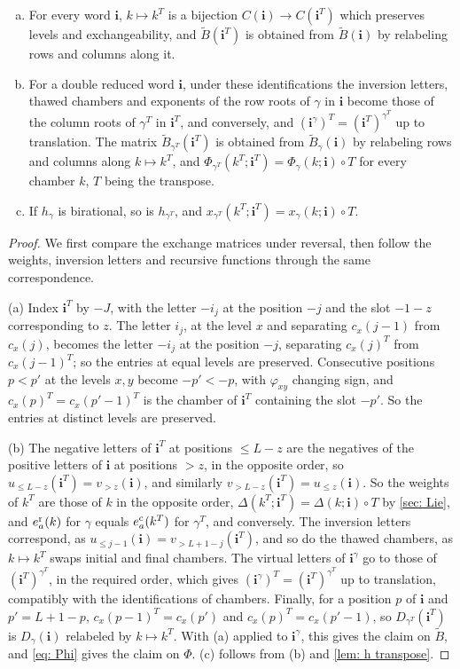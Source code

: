 \documentclass[a4paper]{amsart}
\numberwithin{equation}{section}
\theoremstyle{definition}
\theoremstyle{remark}
\newcommand{\bfi}{\mathbf{i}}
\newcommand{\tB}{\widetilde{B}}
\newcommand{\rr}{{\rm r}}
\newcommand{\cc}{{\rm c}}
\begin{document}
\begin{lemma}
  \label{lem: mirror}
  \begin{enumerate}[(a)]
    \item For every word $\bfi$, $k\mapsto k^T$ is a bijection $C(\bfi)\to C(\bfi^T)$ which preserves levels and exchangeability, and $\tB(\bfi^T)$ is obtained from $\tB(\bfi)$ by relabeling rows and columns along it.
    \item For a double reduced word $\bfi$, under these identifications the inversion letters, thawed chambers and exponents of the row roots of $\gamma$ in $\bfi$ become those of the column roots of $\gamma^T$ in $\bfi^T$, and conversely, and $(\bfi^\gamma)^T=(\bfi^T)^{\gamma^T}$ up to translation.
    The matrix $\tB_{\gamma^T}(\bfi^T)$ is obtained from $\tB_\gamma(\bfi)$ by relabeling rows and columns along $k\mapsto k^T$, and $\Phi_{\gamma^T}(k^T;\bfi^T)=\Phi_\gamma(k;\bfi)\circ T$ for every chamber $k$, $T$ being the transpose.
    \item If $h_\gamma$ is birational, so is $h_{\gamma^T}$, and $x_{\gamma^T}(k^T;\bfi^T)=x_\gamma(k;\bfi)\circ T$.
  \end{enumerate}
\end{lemma}
\begin{proof}
We first compare the exchange matrices under reversal, then follow the weights, inversion letters and recursive functions through the same correspondence.

  (a) Index $\bfi^T$ by $-J$, with the letter $-i_j$ at the position $-j$ and the slot $-1-z$ corresponding to $z$.
  The letter $i_j$, at the level $x$ and separating $c_x(j-1)$ from $c_x(j)$, becomes the letter $-i_j$ at the position $-j$, separating $c_x(j)^T$ from $c_x(j-1)^T$; so the entries at equal levels are preserved.
  Consecutive positions $p<p'$ at the levels $x,y$ become $-p'<-p$, with $\varphi_{xy}$ changing sign, and $c_x(p)^T=c_x(p'-1)^T$ is the chamber of $\bfi^T$ containing the slot $-p'$.
  So the entries at distinct levels are preserved.

  (b) The negative letters of $\bfi^T$ at positions $\le L-z$ are the negatives of the positive letters of $\bfi$ at positions $>z$, in the opposite order, so $u_{\le L-z}(\bfi^T)=v_{>z}(\bfi)$, and similarly $v_{>L-z}(\bfi^T)=u_{\le z}(\bfi)$.
  So the weights of $k^T$ are those of $k$ in the opposite order, $\Delta(k^T;\bfi^T)=\Delta(k;\bfi)\circ T$ by \cref{sec: Lie}, and $e^\rr_a(k)$ for $\gamma$ equals $e^\cc_a(k^T)$ for $\gamma^T$, and conversely.
  The inversion letters correspond, as $u_{\le j-1}(\bfi)=v_{>L+1-j}(\bfi^T)$, and so do the thawed chambers, as $k\mapsto k^T$ swaps initial and final chambers.
  The virtual letters of $\bfi^\gamma$ go to those of $(\bfi^T)^{\gamma^T}$, in the required order, which gives $(\bfi^\gamma)^T=(\bfi^T)^{\gamma^T}$ up to translation, compatibly with the identifications of chambers.
  Finally, for a position $p$ of $\bfi$ and $p'=L+1-p$, $c_x(p-1)^T=c_x(p')$ and $c_x(p)^T=c_x(p'-1)$, so $D_{\gamma^T}(\bfi^T)$ is $D_\gamma(\bfi)$ relabeled by $k\mapsto k^T$. With (a) applied to $\bfi^\gamma$, this gives the claim on $\tB$, and \eqref{eq: Phi} gives the claim on $\Phi$.
  (c) follows from (b) and \cref{lem: h transpose}.
\end{proof}
\end{document}

